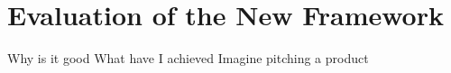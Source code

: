 \chapter{Evaluation of the New Framework}
Why is it good
What have I achieved
Imagine pitching a product